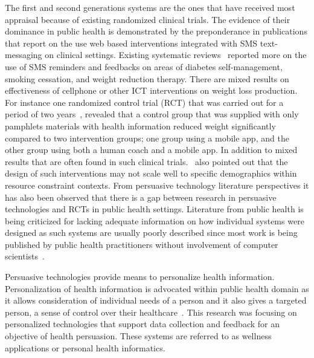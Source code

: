 The first and second generations systems are the ones that have received most appraisal because of existing randomized clinical trials. The evidence of their dominance in public health is demonstrated by the preponderance in publications that report on the use web based interventions integrated with SMS text-messaging on clinical settings. Existing systematic reviews~\citep{cole2010text,fjeldsoe2009behavior,krishna2009healthcare} reported more on the use of SMS reminders and feedbacks on areas of diabetes self-management, smoking cessation, and weight reduction therapy. There are mixed results on effectiveness of cellphone or other ICT interventions on weight loss production. For instance one randomized control trial (RCT) that was carried out for a period of two years~\citep{svetkey2015cell}, revealed that a control group that was supplied with only pamphlets materials with health information reduced weight significantly compared to two intervention groups; one group using a mobile app, and the other group using both a human coach and a mobile app. In addition to mixed results that are often found in such clinical trials.~\cite{cole2010text,kaplan2006can} also pointed out that the design of such interventions may not scale well to specific demographics within resource constraint contexts. From persuasive technology literature perspectives it has also been observed that there is a gap between research in persuasive technologies and RCTs in public health settings. Literature from public health is being criticized for lacking adequate information on how individual systems were designed as such systems are usually poorly described since most work is being published by public health practitioners without involvement of computer scientists~\citep{Oinas-Kukkonen:foundation}.

Persuasive technologies provide means to personalize health information. Personalization of health information is advocated within public health domain as it allows consideration of individual needs of a person and it also gives a targeted person, a  sense of control over their healthcare~\citep{mccallum2012gamification}. This research was focusing on personalized technologies that support data collection and feedback for an objective of health persuasion. These systems are referred to as wellness applications or personal health informatics. 
